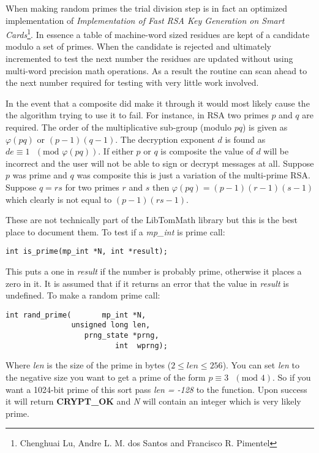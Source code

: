 \documentclass[synpaper]{book}
\def\phi{\varphi}
\begin{document}
When making random primes the trial division step is in fact an optimized implementation of \textit{Implementation of Fast RSA Key Generation on Smart Cards}\footnote{Chenghuai Lu, Andre L. M. dos Santos and Francisco R. Pimentel}.
In essence a table of machine-word sized residues are kept of a candidate modulo a set of primes.  When the candidate
is rejected and ultimately incremented to test the next number the residues are updated without using multi-word precision
math operations.  As a result the routine can scan ahead to the next number required for testing with very little work
involved.

In the event that a composite did make it through it would most likely cause the the algorithm trying to use it to fail.  For 
instance, in RSA two primes $p$ and $q$ are required.  The order of the multiplicative sub-group (modulo $pq$) is given 
as $\phi(pq)$ or $(p - 1)(q - 1)$.  The decryption exponent $d$ is found as $de \equiv 1\mbox{ }(\mbox{mod } \phi(pq))$.  If either $p$ or $q$ is composite the value of $d$ will be incorrect and the user
will not be able to sign or decrypt messages at all.  Suppose $p$ was prime and $q$ was composite this is just a variation of 
the multi-prime RSA.  Suppose $q = rs$ for two primes $r$ and $s$ then $\phi(pq) = (p - 1)(r - 1)(s - 1)$ which clearly is 
not equal to $(p - 1)(rs - 1)$.

These are not technically part of the LibTomMath library but this is the best place to document them.  
To test if a \textit{mp\_int} is prime call:
\begin{verbatim}
int is_prime(mp_int *N, int *result);
\end{verbatim}
This puts a one in \textit{result} if the number is probably prime, otherwise it places a zero in it.  It is assumed that if 
it returns an error that the value in \textit{result} is undefined.  To make 
a random prime call:
\begin{verbatim}
int rand_prime(       mp_int *N, 
               unsigned long len, 
                  prng_state *prng, 
                         int  wprng);
\end{verbatim}
Where \textit{len} is the size of the prime in bytes ($2 \le len \le 256$).  You can set \textit{len} to the negative size you want
to get a prime of the form $p \equiv 3\mbox{ }(\mbox{mod } 4)$.  So if you want a 1024-bit prime of this sort pass 
\textit{len = -128} to the function.  Upon success it will return {\bf CRYPT\_OK} and \textit{N} will contain an integer which
is very likely prime.
\end{document}
